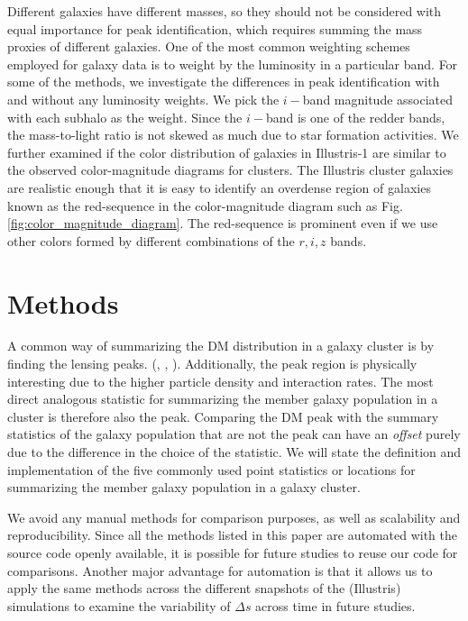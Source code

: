 Different galaxies have different masses, so they should not be considered with equal
importance for peak identification, which requires summing
the mass proxies of different galaxies. One of the most common weighting schemes employed for galaxy data is to weight
by the luminosity in a particular band. For some of the methods, we investigate
the differences in peak identification with and without any luminosity weights.
We pick the $i-$band magnitude
associated with each subhalo as the weight. Since the $i-$band is
one of the redder bands, the mass-to-light ratio is not skewed as much due to star
formation activities. 
We further examined if the color distribution of galaxies in Illustris-1 are
similar to the observed color-magnitude diagrams for clusters.
The Illustris cluster galaxies are realistic enough that it is easy to
identify an overdense region of galaxies known as the red-sequence in the 
color-magnitude diagram such as Fig.
\ref{fig:color_magnitude_diagram}. The red-sequence is prominent even if we
use other colors formed by different combinations of the $r, i, z$ bands.

\section{Methods}\label{sec:methods}
A common way of summarizing the DM distribution in a
galaxy cluster is by finding the lensing peaks.
(\citealt{Medezinski2013}, \citealt{Markevitch2004}, 
\citealt{Zitrin13}). 
Additionally, the peak region is physically 
interesting due to the higher particle density and interaction rates. 
The most direct analogous statistic for summarizing the member galaxy
population in a cluster is therefore also the peak. 
Comparing the DM peak with the summary statistics of the galaxy population that
are not the peak  can have an {\it offset} purely due to the difference in
the choice of the statistic. 
We will state the definition and implementation of the five commonly used 
point statistics or locations for summarizing 
the member galaxy population in a galaxy cluster.

We avoid any manual methods for
comparison purposes, as well as scalability and reproducibility. 
Since all the methods listed in this
paper are automated with the source code openly available, 
it is possible for future studies to reuse our code for comparisons. 
Another major advantage for automation is that it allows us  
to apply
the same methods across the different snapshots of the (Illustris) simulations to
examine the variability of $\Delta s$ across time in future studies. 


